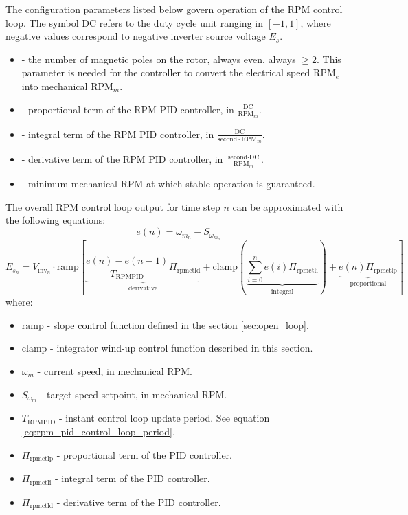 \documentclass{zubaxdoc}
\begin{document}
The configuration parameters listed below govern operation of the RPM control loop.
The symbol $\text{DC}$ refers to the duty cycle unit ranging in $\left[-1, 1\right]$,
where negative values correspond to negative inverter source voltage $E_s$.

\begin{itemize}
\item {} - the number of magnetic poles on the rotor, always even, always $\geq 2$.
This parameter is needed for the controller to convert the electrical speed $\text{RPM}_e$
into mechanical $\text{RPM}_m$.
\item {} - proportional term of the RPM PID controller,
in $\frac{\text{DC}}{\text{RPM}_m}$.
\item {} - integral term of the RPM PID controller,
in $\frac{\text{DC}}{\text{second}\cdot{}\text{RPM}_m}$.
\item {} - derivative term of the RPM PID controller,
in $\frac{\text{second}\cdot{}\text{DC}}{\text{RPM}_m}$.
\item {} - minimum mechanical RPM at which stable operation is guaranteed.
\end{itemize}

The overall RPM control loop output for time step $n$ can be approximated with the following equations:
\begin{equation}
e(n) = \omega_{m_{n}} - S_{\omega_{m_{n}}}
\end{equation}
\begin{equation}
E_{s_n} = V_{\text{inv}_n}\cdot\mathrm{ramp}
\left[
\underbrace{\frac{e\left(n\right) - e\left(n-1\right)}{T_{\text{RPMPID}}} \Pi_{\text{rpmctld}}}_\text{derivative} +
\mathrm{clamp}\left(\underbrace{\sum_{i=0}^n e\left(i\right) \Pi_{\text{rpmctli}}}_\text{integral}\right) +
\underbrace{e\left(n\right) \Pi_{\text{rpmctlp}}}_\text{proportional}
\right]
\end{equation}
where:
\begin{itemize}
\item $\mathrm{ramp}$ - slope control function defined in the section \ref{sec:open_loop}.
\item $\mathrm{clamp}$ - integrator wind-up control function described in this section.
\item $\omega_{m}$ - current speed, in mechanical RPM.
\item $S_{\omega_{m}}$ - target speed setpoint, in mechanical RPM.
\item $T_{\text{RPMPID}}$ - instant control loop update period.
See equation \ref{eq:rpm_pid_control_loop_period}.
\item $\Pi_{\text{rpmctlp}}$ - proportional term of the PID controller.
\item $\Pi_{\text{rpmctli}}$ - integral term of the PID controller.
\item $\Pi_{\text{rpmctld}}$ - derivative term of the PID controller.
\end{itemize}
\end{document}
